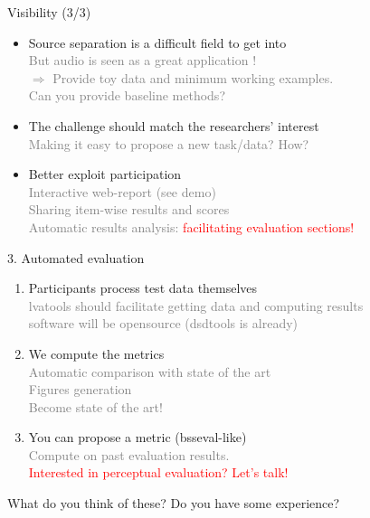 \documentclass{beamer}
\begin{document}
\begin{frame}{Visibility (3/3)}
\begin{itemize}

\item Source separation is a difficult field to get into\\
\textcolor{gray}{But audio is seen as a great application !\\$\Rightarrow$ Provide toy data and minimum working examples.\\Can you provide baseline methods?}
\item The challenge should match the researchers' interest\\
\textcolor{gray}{Making it easy to propose a new task/data? How?}
\item Better exploit participation\\
\textcolor{gray}{Interactive web-report (see demo)\\
Sharing item-wise results and scores\\
Automatic results analysis: }\textcolor{red}{facilitating evaluation sections!}
\end{itemize}
\end{frame}

\begin{frame}{3. Automated evaluation}
\begin{enumerate}
\item Participants process test data themselves\\
\textcolor{gray}{lvatools should facilitate getting data and computing results\\software will be opensource (dsdtools is already)}
\item We compute the metrics\\
\textcolor{gray}{Automatic comparison with state of the art\\Figures generation\\Become state of the art!}
\item You can propose a metric (bsseval-like)\\
\textcolor{gray}{Compute on past evaluation results. }\\
\textcolor{red}{Interested in perceptual evaluation? Let's talk!}
\end{enumerate}

\vspace{0.5cm}What do you think of these? Do you have some experience?
\end{frame}
\end{document}
